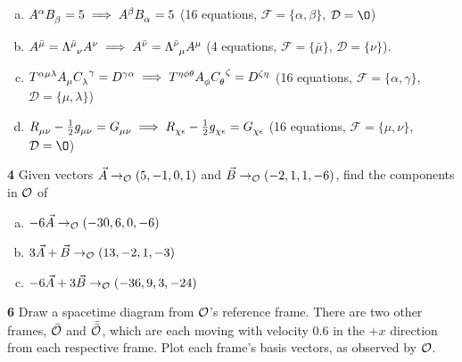 \documentclass[gr-notes.tex]{subfiles}
\begin{document}
\begin{enumerate}[(a)]
\item $\tensor{A}{^\alpha} \tensor{B}{_\beta} = 5 \implies
       \tensor{A}{^\beta} \tensor{B}{_\alpha} = 5$
      (16 equations,
       $\mathcal{F} = \{ \alpha, \beta \}$,
       $\mathcal{D} = \O$)

\item $\tensor{A}{^{\bar\mu}} =
       \tensor{\Lambda}{^{\bar\mu}_\nu} \tensor{A}{^\nu} \implies
       \tensor{A}{^{\bar\nu}} =
       \tensor{\Lambda}{^{\bar\nu}_\mu} \tensor{A}{^\mu}$
      (4 equations,
       $\mathcal{F} = \{ \bar\mu \}$,
       $\mathcal{D} = \{ \nu \}$).

\item $\tensor{T}{^{\alpha\mu\lambda}}
       \tensor{A}{_\mu}
       \tensor{C}{_\lambda^\gamma} =
       \tensor{D}{^{\gamma\alpha}} \implies
       \tensor{T}{^{\eta\phi\theta}}
       \tensor{A}{_\phi}
       \tensor{C}{_\theta^\zeta} =
       \tensor{D}{^{\zeta\eta}}$
      (16 equations,
       $\mathcal{F} = \{ \alpha, \gamma \}$,
       $\mathcal{D} = \{ \mu, \lambda \}$)

\item $\tensor{R}{_{\mu\nu}} - \frac{1}{2} \tensor{g}{_{\mu\nu}} =
       \tensor{G}{_{\mu\nu}} \implies
       \tensor{R}{_{\chi\epsilon}} - \frac{1}{2} \tensor{g}{_{\chi\epsilon}} =
       \tensor{G}{_{\chi\epsilon}}$
      (16 equations,
       $\mathcal{F} = \{ \mu, \nu \}$,
       $\mathcal{D} = \O$)
\end{enumerate}


\textbf{4}
Given vectors $\vec{A} \to_{\mathcal{O}} (5, -1, 0, 1)$ and $\vec{B} \to_{\mathcal{O}} (-2, 1, 1, -6)$, find the components in $\mathcal{O}$ of

\begin{enumerate}[(a)]
\item $-6\vec{A} \to_{\mathcal{O}} (-30, 6, 0, -6)$

\item $3\vec{A} + \vec{B} \to_{\mathcal{O}} (13, -2, 1, -3)$

\item $-6\vec{A} + 3\vec{B} \to_{\mathcal{O}} (-36, 9, 3, -24)$
\end{enumerate}


\textbf{6}
Draw a spacetime diagram from $\mathcal{O}$'s reference frame. There are two other frames, $\bar{\mathcal{O}}$ and $\bar{\bar{\mathcal{O}}}$, which are each moving with velocity $0.6$ in the $+x$ direction from each respective frame. Plot each frame's basis vectors, as observed by $\mathcal{O}$.
\end{document}
